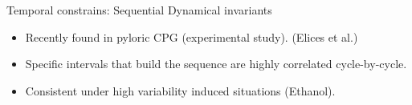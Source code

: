 \documentclass[aspectratio=43]{beamer}
\begin{document}
\begin{frame}{Temporal constrains: Sequential Dynamical invariants}

		\begin{itemize}
			\item<1->Recently found in pyloric CPG (experimental study). (Elices et al.)
			\item<1->Specific intervals that build the sequence are highly correlated cycle-by-cycle.
			\item<1->Consistent under high variability induced situations (Ethanol).
		\end{itemize}
	\begin{figure}[h!]
		\centering
	\end{figure}
\end{frame}
\end{document}
